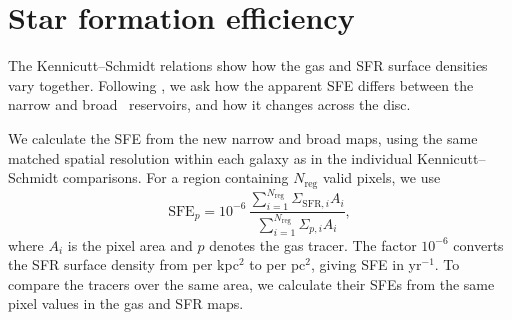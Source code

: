 
\begingroup
\raggedbottom
\setlength{\parskip}{6pt}
\section[Star formation efficiency]{Star formation efficiency}
\label{sec:sfe}

The Kennicutt--Schmidt relations show how the gas and SFR surface densities vary together. Following \citet{Leroy2008}, we ask how the apparent SFE differs between the narrow and broad \HI\ reservoirs, and how it changes across the disc.%

We calculate the SFE from the new narrow and broad maps, using the same matched spatial resolution within each galaxy as in the individual Kennicutt--Schmidt comparisons. For a region containing $N_{\mathrm{reg}}$ valid pixels, we use
\begin{equation}
\label{eq:regional_sfe}
\mathrm{SFE}_p = 10^{-6}\,
\frac{\displaystyle\sum_{i=1}^{N_{\mathrm{reg}}}\Sigma_{\mathrm{SFR},i} A_i}
{\displaystyle\sum_{i=1}^{N_{\mathrm{reg}}}\Sigma_{p,i} A_i},
\end{equation}
where $A_i$ is the pixel area and $p$ denotes the gas tracer. The factor $10^{-6}$ converts the SFR surface density from per kpc$^2$ to per pc$^2$, giving SFE in yr$^{-1}$. To compare the tracers over the same area, we calculate their SFEs from the same pixel values in the gas and SFR maps.

